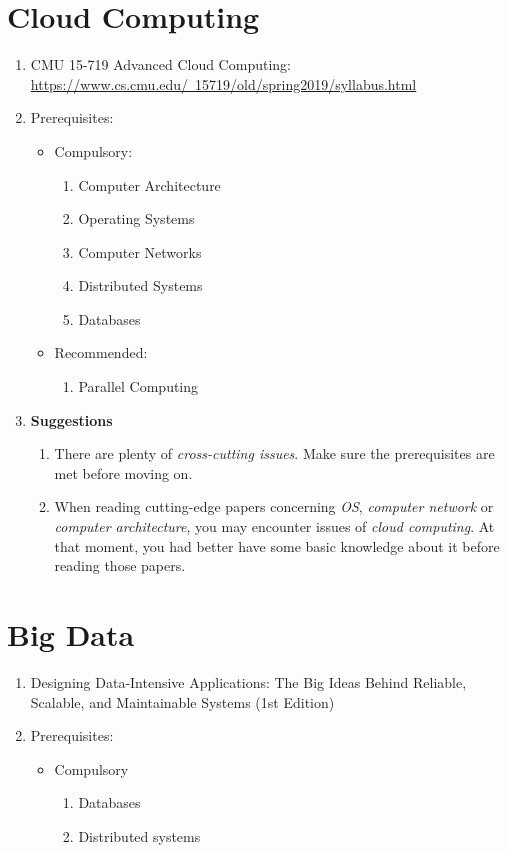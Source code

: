 \documentclass{article}
\begin{document}
\section{Cloud Computing}
\begin{enumerate}
    \item CMU 15-719 Advanced Cloud Computing:\\
    \href{https://www.cs.cmu.edu/~15719/old/spring2019/syllabus.html}{https://www.cs.cmu.edu/~15719/old/spring2019/syllabus.html}
    \item Prerequisites:
    \begin{itemize}
        \item Compulsory:
        \begin{enumerate}
            \item Computer Architecture
            \item Operating Systems
            \item Computer Networks
            \item Distributed Systems
            \item Databases
        \end{enumerate}
        \item Recommended:
        \begin{enumerate}
            \item Parallel Computing
        \end{enumerate}
    \end{itemize}
    \item \textbf{Suggestions}
    \begin{enumerate}
        \item There are plenty of \emph{cross-cutting issues}.
        Make sure the prerequisites are met before moving on.
        \item When reading cutting-edge papers concerning \emph{OS}, \emph{computer network} or \emph{computer architecture}, you may encounter issues of \emph{cloud computing}.
        At that moment, you had better have some basic knowledge about it before reading those papers.
    \end{enumerate}
\end{enumerate}

\section{Big Data}
\begin{enumerate}
    \item Designing Data-Intensive Applications: The Big Ideas Behind Reliable, Scalable, and Maintainable Systems (1st Edition) \cite{kleppmann2017designing}
    \item Prerequisites:
    \begin{itemize}
        \item Compulsory
        \begin{enumerate}
            \item Databases
            \item Distributed systems
        \end{enumerate}
    \end{itemize}
\end{enumerate}
\end{document}
